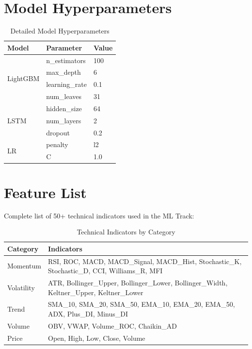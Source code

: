 
\section{Model Hyperparameters}

\begin{table}[h]
\centering
\caption{Detailed Model Hyperparameters}
\begin{tabular}{lll}
\toprule
Model & Parameter & Value \\
\midrule
\multirow{4}{*}{LightGBM} & n\_estimators & 100 \\
 & max\_depth & 6 \\
 & learning\_rate & 0.1 \\
 & num\_leaves & 31 \\
\midrule
\multirow{3}{*}{LSTM} & hidden\_size & 64 \\
 & num\_layers & 2 \\
 & dropout & 0.2 \\
\midrule
\multirow{2}{*}{LR} & penalty & l2 \\
 & C & 1.0 \\
\bottomrule
\end{tabular}
\end{table}

\section{Feature List}

Complete list of 50+ technical indicators used in the ML Track:

\begin{table}[h]
\centering
\caption{Technical Indicators by Category}
\begin{tabular}{lp{10cm}}
\toprule
Category & Indicators \\
\midrule
Momentum & RSI, ROC, MACD, MACD\_Signal, MACD\_Hist, Stochastic\_K, Stochastic\_D, CCI, Williams\_R, MFI \\
Volatility & ATR, Bollinger\_Upper, Bollinger\_Lower, Bollinger\_Width, Keltner\_Upper, Keltner\_Lower \\
Trend & SMA\_10, SMA\_20, SMA\_50, EMA\_10, EMA\_20, EMA\_50, ADX, Plus\_DI, Minus\_DI \\
Volume & OBV, VWAP, Volume\_ROC, Chaikin\_AD \\
Price & Open, High, Low, Close, Volume \\
\bottomrule
\end{tabular}
\end{table}

